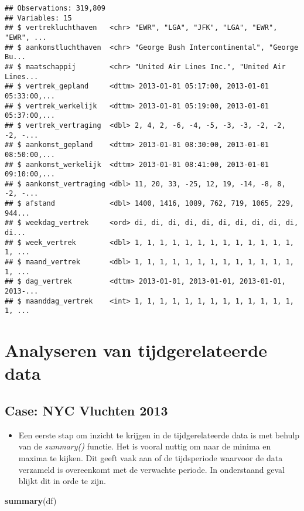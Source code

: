 \documentclass[]{memoir}
\newenvironment{Shaded}{\begin{snugshade}}{\end{snugshade}}
\newcommand{\KeywordTok}[1]{\textcolor[rgb]{0.13,0.29,0.53}{\textbf{#1}}}
\newcommand{\NormalTok}[1]{#1}
\providecommand{\tightlist}{%
  \setlength{\itemsep}{0pt}\setlength{\parskip}{0pt}}
\begin{document}
\begin{verbatim}
## Observations: 319,809
## Variables: 15
## $ vertrekluchthaven   <chr> "EWR", "LGA", "JFK", "LGA", "EWR", "EWR", ...
## $ aankomstluchthaven  <chr> "George Bush Intercontinental", "George Bu...
## $ maatschappij        <chr> "United Air Lines Inc.", "United Air Lines...
## $ vertrek_gepland     <dttm> 2013-01-01 05:17:00, 2013-01-01 05:33:00,...
## $ vertrek_werkelijk   <dttm> 2013-01-01 05:19:00, 2013-01-01 05:37:00,...
## $ vertrek_vertraging  <dbl> 2, 4, 2, -6, -4, -5, -3, -3, -2, -2, -2, -...
## $ aankomst_gepland    <dttm> 2013-01-01 08:30:00, 2013-01-01 08:50:00,...
## $ aankomst_werkelijk  <dttm> 2013-01-01 08:41:00, 2013-01-01 09:10:00,...
## $ aankomst_vertraging <dbl> 11, 20, 33, -25, 12, 19, -14, -8, 8, -2, -...
## $ afstand             <dbl> 1400, 1416, 1089, 762, 719, 1065, 229, 944...
## $ weekdag_vertrek     <ord> di, di, di, di, di, di, di, di, di, di, di...
## $ week_vertrek        <dbl> 1, 1, 1, 1, 1, 1, 1, 1, 1, 1, 1, 1, 1, 1, ...
## $ maand_vertrek       <dbl> 1, 1, 1, 1, 1, 1, 1, 1, 1, 1, 1, 1, 1, 1, ...
## $ dag_vertrek         <dttm> 2013-01-01, 2013-01-01, 2013-01-01, 2013-...
## $ maanddag_vertrek    <int> 1, 1, 1, 1, 1, 1, 1, 1, 1, 1, 1, 1, 1, 1, ...
\end{verbatim}

\section{Analyseren van tijdgerelateerde
data}\label{analyseren-van-tijdgerelateerde-data}

\subsection{Case: NYC Vluchten 2013}\label{case-nyc-vluchten-2013-2}

\begin{itemize}
\tightlist
\item
  Een eerste stap om inzicht te krijgen in de tijdgerelateerde data is
  met behulp van de \emph{summary()} functie. Het is vooral nuttig om
  naar de minima en maxima te kijken. Dit geeft vaak aan of de
  tijdsperiode waarvoor de data verzameld is overeenkomt met de
  verwachte periode. In onderstaand geval blijkt dit in orde te zijn.
\end{itemize}

\begin{Shaded}
\begin{Highlighting}[]
\KeywordTok{summary}\NormalTok{(df)}
\end{Highlighting}
\end{Shaded}
\end{document}
